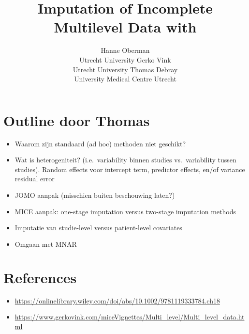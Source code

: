 \documentclass[
]{jss}
\author{
Hanne Oberman\\Utrecht University \And Gerko Vink\\Utrecht
University \And Thomas Debray\\University Medical Centre Utrecht
}
\title{Imputation of Incomplete Multilevel Data with \pkg{mice}}
\begin{document}
\hypertarget{outline-door-thomas}{%
\section{Outline door Thomas}\label{outline-door-thomas}}

\begin{itemize}
\item
  Waarom zijn standaard (ad hoc) methoden niet geschikt?
\item
  Wat is heterogeniteit? (i.e.~variability binnen studies
  vs.~variability tussen studies). Random effects voor intercept term,
  predictor effects, en/of variance residual error
\item
  JOMO aanpak (misschien buiten beschouwing laten?)
\item
  MICE aanpak: one-stage imputation versus two-stage imputation methods
\item
  Imputatie van studie-level versus patient-level covariates
\item
  Omgaan met MNAR
\end{itemize}

\hypertarget{references}{%
\section{References}\label{references}}

\begin{itemize}
\item
  \href{Chapter:\%20Dealing\%20with\%20Missing\%20Data\%20in\%20an\%20IPD\%20Meta-analysis}{https://onlinelibrary.wiley.com/doi/abs/10.1002/9781119333784.ch18}
\item
  \href{Vignette:\%20gerkovink.com/miceVignettes/Multi_level}{https://www.gerkovink.com/miceVignettes/Multi\_level/Multi\_level\_data.html}
\end{itemize}
\end{document}
